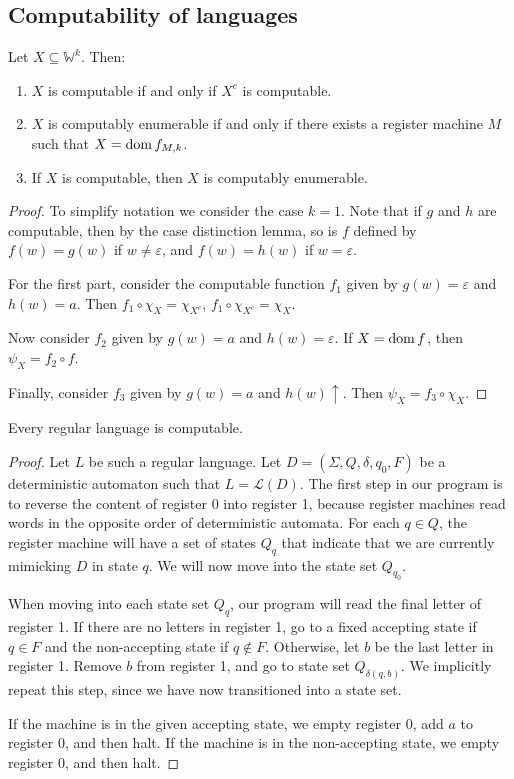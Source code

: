 \subsection{Computability of languages}
\begin{proposition}
	Let \( X \subseteq \mathbb W^k \).
	Then:
	\begin{enumerate}
		\item \( X \) is computable if and only if \( X^c \) is computable.
		\item \( X \) is computably enumerable if and only if there exists a register machine \( M \) such that \( X = \operatorname{dom} f_{M,k} \).
		\item If \( X \) is computable, then \( X \) is computably enumerable.
	\end{enumerate}
\end{proposition}
\begin{proof}
	To simplify notation we consider the case \( k = 1 \).
	Note that if \( g \) and \( h \) are computable, then by the case distinction lemma, so is \( f \) defined by \( f(w) = g(w) \) if \( w \neq \varepsilon \), and \( f(w) = h(w) \) if \( w = \varepsilon \).

	For the first part, consider the computable function \( f_1 \) given by \( g(w) = \varepsilon \) and \( h(w) = a \).
	Then \( f_1 \circ \chi_X = \chi_{X^c} \), \( f_1 \circ \chi_{X^c} = \chi_X \).

	Now consider \( f_2 \) given by \( g(w) = a \) and \( h(w) = \varepsilon \).
	If \( X = \operatorname{dom} f \), then \( \psi_X = f_2 \circ f \).

	Finally, consider \( f_3 \) given by \( g(w) = a \) and \( h(w) \uparrow \).
	Then \( \psi_X = f_3 \circ \chi_X \).
\end{proof}
\begin{theorem}
	Every regular language is computable.
\end{theorem}
\begin{proof}
	Let \( L \) be such a regular language.
	Let \( D = (\Sigma, Q, \delta, q_0, F) \) be a deterministic automaton such that \( L = \mathcal L(D) \).
	The first step in our program is to reverse the content of register 0 into register 1, because register machines read words in the opposite order of deterministic automata.
	For each \( q \in Q \), the register machine will have a set of states \( Q_q \) that indicate that we are currently mimicking \( D \) in state \( q \).
	We will now move into the state set \( Q_{q_0} \).

	When moving into each state set \( Q_q \), our program will read the final letter of register 1.
	If there are no letters in register 1, go to a fixed accepting state if \( q \in F \) and the non-accepting state if \( q \not\in F \).
	Otherwise, let \( b \) be the last letter in register 1.
	Remove \( b \) from register 1, and go to state set \( Q_{\delta(q,b)} \).
	We implicitly repeat this step, since we have now transitioned into a state set.

	If the machine is in the given accepting state, we empty register 0, add \( a \) to register 0, and then halt.
	If the machine is in the non-accepting state, we empty register 0, and then halt.
\end{proof}

